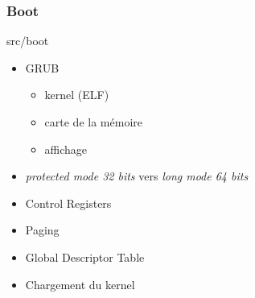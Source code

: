 \documentclass[10pt,a4paper]{beamer}
\begin{document}
\begin{frame}
  \frametitle{Boot}
  \textrm{src/boot}

  \begin{itemize}
  \item GRUB
    \begin{itemize}
    \item kernel (ELF)
    \item carte de la mémoire
    \item affichage
    \end{itemize}
  \item \textit{protected mode 32 bits} vers \textit{long mode 64 bits}
  \item Control Registers
  \item Paging
  \item Global Descriptor Table
  \item Chargement du kernel
  \end{itemize}
\end{frame}
\end{document}
